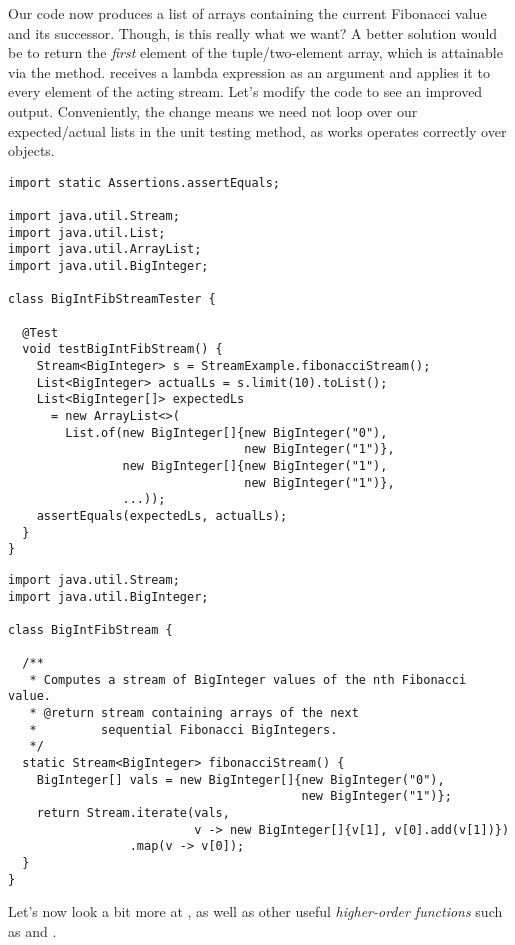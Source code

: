 Our code now produces a list of  arrays containing the current Fibonacci value and its successor. 
Though, is this really what we want? 
A better solution would be to return the \emph{first} element of the tuple/two-element array, which is attainable via the  method. 
 receives a lambda expression as an argument and applies it to every element of the acting stream. 
Let's modify the code to see an improved output. 
Conveniently, the change means we need not loop over our expected/actual lists in the unit testing method, as  works operates correctly over  objects.

\begin{lstlisting}[language=MyJava]
import static Assertions.assertEquals;

import java.util.Stream;
import java.util.List;
import java.util.ArrayList;
import java.util.BigInteger;

class BigIntFibStreamTester {

  @Test
  void testBigIntFibStream() {
    Stream<BigInteger> s = StreamExample.fibonacciStream();
    List<BigInteger> actualLs = s.limit(10).toList();
    List<BigInteger[]> expectedLs 
      = new ArrayList<>(
        List.of(new BigInteger[]{new BigInteger("0"), 
                                 new BigInteger("1")},
                new BigInteger[]{new BigInteger("1"), 
                                 new BigInteger("1")},
                ...));
    assertEquals(expectedLs, actualLs);
  }
}
\end{lstlisting}

\begin{lstlisting}[language=MyJava]
import java.util.Stream;
import java.util.BigInteger;

class BigIntFibStream {

  /**
   * Computes a stream of BigInteger values of the nth Fibonacci value.
   * @return stream containing arrays of the next 
   *         sequential Fibonacci BigIntegers.
   */
  static Stream<BigInteger> fibonacciStream() {
    BigInteger[] vals = new BigInteger[]{new BigInteger("0"),
                                         new BigInteger("1")};
    return Stream.iterate(vals, 
                          v -> new BigInteger[]{v[1], v[0].add(v[1])})
                 .map(v -> v[0]);
  }
}
\end{lstlisting}

Let's now look a bit more at , as well as other useful \emph{higher-order functions} such as  and .

